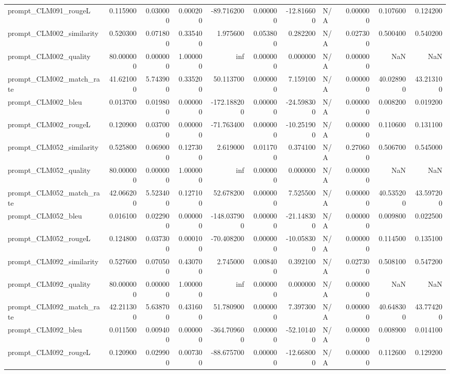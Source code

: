 \begin{tabular}{lrrrrrrlrrr}
prompt_CLM091_rougeL & 0.115900 & 0.030000 & 0.000200 & -89.716200 & 0.000000 & -12.816600 & N/A & 0.000000 & 0.107600 & 0.124200 \\
prompt_CLM002_similarity & 0.520300 & 0.071800 & 0.335400 & 1.975600 & 0.053800 & 0.282200 & N/A & 0.027300 & 0.500400 & 0.540200 \\
prompt_CLM002_quality & 80.000000 & 0.000000 & 1.000000 & inf & 0.000000 & 0.000000 & N/A & 0.000000 & NaN & NaN \\
prompt_CLM002_match_rate & 41.621000 & 5.743900 & 0.335200 & 50.113700 & 0.000000 & 7.159100 & N/A & 0.000000 & 40.028900 & 43.213100 \\
prompt_CLM002_bleu & 0.013700 & 0.019800 & 0.000000 & -172.188200 & 0.000000 & -24.598300 & N/A & 0.000000 & 0.008200 & 0.019200 \\
prompt_CLM002_rougeL & 0.120900 & 0.037000 & 0.000000 & -71.763400 & 0.000000 & -10.251900 & N/A & 0.000000 & 0.110600 & 0.131100 \\
prompt_CLM052_similarity & 0.525800 & 0.069000 & 0.127300 & 2.619000 & 0.011700 & 0.374100 & N/A & 0.270600 & 0.506700 & 0.545000 \\
prompt_CLM052_quality & 80.000000 & 0.000000 & 1.000000 & inf & 0.000000 & 0.000000 & N/A & 0.000000 & NaN & NaN \\
prompt_CLM052_match_rate & 42.066200 & 5.523400 & 0.127100 & 52.678200 & 0.000000 & 7.525500 & N/A & 0.000000 & 40.535200 & 43.597200 \\
prompt_CLM052_bleu & 0.016100 & 0.022900 & 0.000000 & -148.037900 & 0.000000 & -21.148300 & N/A & 0.000000 & 0.009800 & 0.022500 \\
prompt_CLM052_rougeL & 0.124800 & 0.037300 & 0.000100 & -70.408200 & 0.000000 & -10.058300 & N/A & 0.000000 & 0.114500 & 0.135100 \\
prompt_CLM092_similarity & 0.527600 & 0.070500 & 0.430700 & 2.745000 & 0.008400 & 0.392100 & N/A & 0.027300 & 0.508100 & 0.547200 \\
prompt_CLM092_quality & 80.000000 & 0.000000 & 1.000000 & inf & 0.000000 & 0.000000 & N/A & 0.000000 & NaN & NaN \\
prompt_CLM092_match_rate & 42.211300 & 5.638700 & 0.431600 & 51.780900 & 0.000000 & 7.397300 & N/A & 0.000000 & 40.648300 & 43.774200 \\
prompt_CLM092_bleu & 0.011500 & 0.009400 & 0.000000 & -364.709600 & 0.000000 & -52.101400 & N/A & 0.000000 & 0.008900 & 0.014100 \\
prompt_CLM092_rougeL & 0.120900 & 0.029900 & 0.007300 & -88.675700 & 0.000000 & -12.668000 & N/A & 0.000000 & 0.112600 & 0.129200 \\

\end{tabular}

